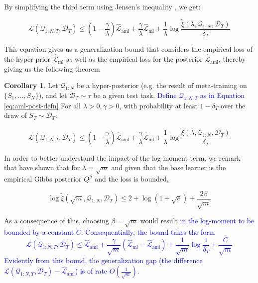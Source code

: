 \documentclass{article}
\theoremstyle{definition}
\newtheorem{corollary}[theorem]{Corollary}
\newcommand{\LFe}[1]{\textcolor{blue}{#1}}
\begin{document}
By simplifying the third term using Jensen's inequality , we get:

\begin{equation} \label{eq:pb-adapt-multi}
\mathcal{L}(\mathcal{Q}_{1:N,T}, \mathcal{D}_T) \leq 
(1-\frac{\gamma}{\lambda})\hat{\mathcal{L}}_{\mathrm{aml}} + \frac{\gamma}{\lambda}\hat{\mathcal{L}}_{\mathrm{ml}} 
+\frac{1}{\lambda}\log\frac{\tilde{\xi}(\lambda,\mathcal{Q}_{1:N},\mathcal{D}_T)}{\delta_T}
\end{equation}

This equation gives us a generalization bound that considers the empirical loss of the hyper-prior $\hat{\mathcal{L}}_{\mathrm{ml}}$ as well as the empirical loss for the posterior $\hat{\mathcal{L}}_{\mathrm{aml}}$, thereby giving us the following theorem

\begin{corollary} \label{thm:main-result-gibbs}
	Let $\mathcal{Q}_{1:N}$ be a hyper-posterior (e.g. the result of meta-training on $\{S_1,...,S_N\}$), and let $\mathcal{D}_T\sim \tau$ be a given test task. \LFe{Define  $\mathcal{Q}_{1:N,T}$ as in Equation \ref{eq:aml-post-defn}} 
	For all $\lambda>0, \gamma>0$, 
	with probability at least $1-\delta_T$ over the draw of $S_T\sim \mathcal{D}_T$:
	
	$$\mathcal{L}(\mathcal{Q}_{1:N,T}, \mathcal{D}_T) \leq 
	(1-\frac{\gamma}{\lambda})\hat{\mathcal{L}}_{\mathrm{aml}} + \frac{\gamma}{\lambda}\hat{\mathcal{L}}_{\mathrm{ml}} 
	+\frac{1}{\lambda}\log\frac{\tilde{\xi}(\lambda,\mathcal{Q}_{1:N},\mathcal{D}_T)}{\delta_T}$$
\end{corollary}

In order to better understand the impact of the log-moment term, we remark that \citet{Rivasplata2020} have shown that for $\lambda=\sqrt{m}$ and given that the base learner is the empirical Gibbs posterior $Q^\beta$ and the loss is bounded,

$$\log\tilde{\xi}(\sqrt{m},\mathcal{Q}_{1:N},\mathcal{D}_T) \leq 2+\log(1+\sqrt{e})+\frac{2\beta}{\sqrt{m}} $$

As a consequence of this, choosing $\beta=\sqrt{m}$ would result 
\LFe{in the log-moment to be bounded by a constant $C$. Consequentially, the bound takes the form
$$\mathcal{L}(\mathcal{Q}_{1:N,T}, \mathcal{D}_T) \leq \hat{\mathcal{L}}_{\mathrm{aml}} +
\frac{\gamma}{\sqrt{m}}(\hat{\mathcal{L}}_{\mathrm{ml}}-\hat{\mathcal{L}}_{\mathrm{aml}}) 
+\frac{1}{\sqrt{m}}\log\frac{1}{\delta_T}+\frac{C}{\sqrt{m}}$$
Evidently from this bound, the generalization gap (the difference $\mathcal{L}(\mathcal{Q}_{1:N,T}, \mathcal{D}_T)-\hat{\mathcal{L}}_{\mathrm{aml}}$) is of rate $O\left (\frac{1}{\sqrt{m}}\right )$.}
\end{document}
